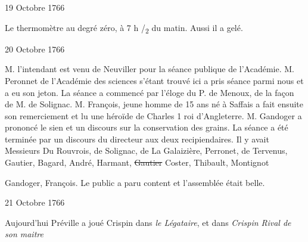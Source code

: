                      \begin{diary}{19 Octobre 1766}{}

                         Le thermomètre au degré zéro, à 7 h /\textsubscript{2}
                              du matin. Aussi il a gelé. \bigskip


                     \end{diary}

                     \begin{diary}{20 Octobre 1766}{}


                           M. l’intendant est venu de
                              Neuviller pour
                           la séance publique de l’Académie.
                              M.
                              Peronnet de l’Académie des sciences s’étant trouvé ici
                           a pris séance parmi nous et a eu son
                           jeton. La séance a commencé par
                           l’éloge du P. de Menoux, de la
                           façon de M.
                              de Solignac. M.
                              François, jeune homme
                           de 15 ans né à Saffais a fait
                           ensuite
                           son remerciement et lu une héroïde
                              de
                              Charles 1 roi
                              d’Angleterre. M.
                              Gandoger
                           a prononcé le sien et un discours sur
                              la
                              conservation des grains. La séance a
                           été terminée par un discours du directeur
                           aux deux recipiendaires. Il y avait Messieurs
                           Du Rouvrois, de Solignac, de
                              La Galaizière,
                           Perronet, de Tervenus, Gautier, Bagard,
                           André, Harmant, \sout{Gautier}
                           Coster, Thibault,
                           Montignot

                           Gandoger, François. Le public a paru
                           content et l’assemblée était belle. \bigskip


                     \end{diary}

                     \begin{diary}{21 Octobre 1766}{}

                         Aujourd'hui Préville a joué Crispin dans
                           \emph{le Légataire}, et dans \emph{Crispin Rival
                              de son maitre}
                        \bigskip


                     \end{diary}

